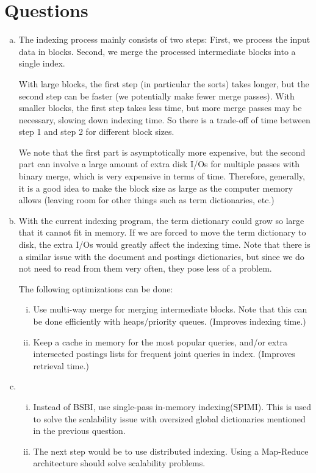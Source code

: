 \documentclass[10pt]{article}
\begin{document}
\section{Questions}
\begin{enumerate}[a)]
\item
The indexing process mainly consists of two steps: First, we process the input data in blocks. Second, we merge the processed intermediate blocks into a single index.

With large blocks, the first step (in particular the sorts) takes longer, but the second step can be faster (we potentially make fewer merge passes). With smaller blocks, the first step takes less time, but more merge passes may be necessary, slowing down indexing time. So there is a trade-off of time between step 1 and step 2 for different block sizes.

We note that the first part is asymptotically more expensive, but the second part can involve a large amount of extra disk I/Os for multiple passes with binary merge, which is very expensive in terms of time. Therefore, generally, it is a good idea to make the block size as large as the computer memory allows (leaving room for other things such as term dictionaries, etc.)

\item
With the current indexing program, the term dictionary could grow so large that it cannot fit in memory. If we are forced to move the term dictionary to disk, the extra I/Os would greatly affect the indexing time. Note that there is a similar issue with the document and postings dictionaries, but since we do not need to read from them very often, they pose less of a problem.

The following optimizations can be done:
\begin{enumerate}[(i)]
\item Use multi-way merge for merging intermediate blocks. Note that this can be done efficiently with heaps/priority queues. (Improves indexing time.)
\item Keep a cache in memory for the most popular queries, and/or extra intersected postings lists for frequent joint queries in index. (Improves retrieval time.)
\end{enumerate}
\item
\begin{enumerate}[(i)]
\item Instead of BSBI, use single-pass in-memory indexing(SPIMI). This is used to solve the scalability issue with oversized global dictionaries mentioned in the previous question.
\item The next step would be to use distributed indexing. Using a Map-Reduce architecture should solve scalability problems.
\end{enumerate}
\end{enumerate}
\end{document}
